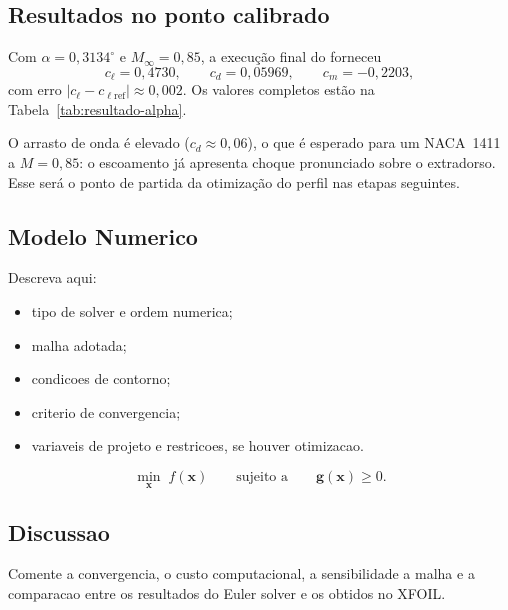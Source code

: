 \begin{table}[H]
\centering
\caption{Análises Euler do NACA~1411 em $M_{\infty}=0{,}85$ usadas
para calibrar $\alpha$ ao $c_{\ell\mathrm{ref}}$.}
\label{tab:alpha-naca1411}

\end{table}

\subsection{Resultados no ponto calibrado}

Com $\alpha = 0{,}3134^\circ$ e $M_{\infty}=0{,}85$, a execução final do
 forneceu
\begin{equation}
c_\ell = 0{,}4730,
\qquad
c_d = 0{,}05969,
\qquad
c_m = -0{,}2203,
\end{equation}
com erro $|c_\ell - c_{\ell\mathrm{ref}}|\approx 0{,}002$. Os valores
completos estão na Tabela~\ref{tab:resultado-alpha}.

\begin{table}[H]
\centering
\caption{Resultado Euler do NACA~1411 no ângulo de ataque de projeto.}
\label{tab:resultado-alpha}
\small

\end{table}

O arrasto de onda é elevado ($c_d\approx 0{,}06$), o que é esperado para
um NACA~1411 a $M=0{,}85$: o escoamento já apresenta choque pronunciado
sobre o extradorso. Esse será o ponto de partida da otimização do
perfil nas etapas seguintes.

\subsection{Modelo Numerico}

Descreva aqui:
\begin{itemize}
\item tipo de solver e ordem numerica;
\item malha adotada;
\item condicoes de contorno;
\item criterio de convergencia;
\item variaveis de projeto e restricoes, se houver otimizacao.
\end{itemize}

\begin{equation}
\min_{\mathbf{x}} \; f(\mathbf{x})
\qquad
\text{sujeito a} \qquad
\mathbf{g}(\mathbf{x}) \ge 0.
\end{equation}

\subsection{Discussao}

Comente a convergencia, o custo computacional, a sensibilidade a malha e a
comparacao entre os resultados do Euler solver e os obtidos no XFOIL.
